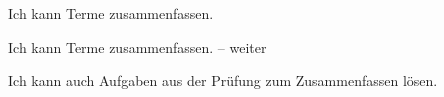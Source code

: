 \begin{kbaufgabe}{Ich kann Terme zusammenfassen.}
\begin{kbblock}
\end{kbblock}
\begin{kbblock}
\end{kbblock}
\begin{kbblock}
\end{kbblock}
\begin{kbblock}
\end{kbblock}
\end{kbaufgabe}


\begin{kbaufgabe}{Ich kann Terme zusammenfassen. – weiter}
\begin{kbblock}
\end{kbblock}
\begin{kbblock}
\end{kbblock}
\begin{kbblock}
\end{kbblock}
\end{kbaufgabe}


\begin{kbaufgabe}{Ich kann auch Aufgaben aus der Prüfung zum Zusammenfassen lösen.}
\begin{kbblock}
\item[]
\end{kbblock}
\end{kbaufgabe}


